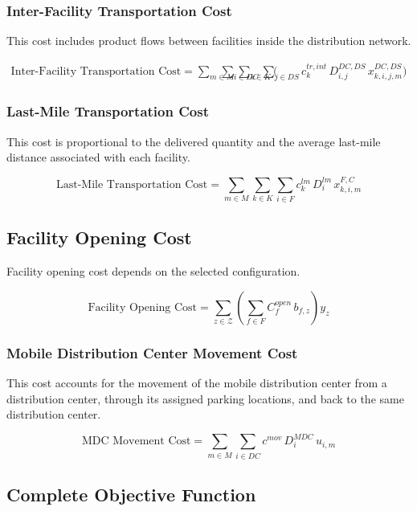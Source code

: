 \documentclass[12pt]{article}
\begin{document}
\subsubsection{Inter-Facility Transportation Cost}

This cost includes product flows between facilities inside the distribution network.

\begin{align*}
\text{Inter-Facility Transportation Cost}
=
\sum_{m \in M} \sum_{k \in K}
\Bigg(
& \sum_{i \in DC} \sum_{j \in DS}
c^{tr,int}_k \, D^{DC,DS}_{i,j} \, x^{DC,DS}_{k,i,j,m}
\Bigg)
\end{align*}

\subsubsection{Last-Mile Transportation Cost}

This cost is proportional to the delivered quantity and the average last-mile distance associated with each facility.

\[
\text{Last-Mile Transportation Cost}
=
\sum_{m \in M}\sum_{k \in K}\sum_{i \in F}
c^{lm}_k \, D^{lm}_i \, x^{F,C}_{k,i,m}
\]

\subsection{Facility Opening Cost}

Facility opening cost depends on the selected configuration.

\[
\text{Facility Opening Cost}
=
\sum_{z \in \mathcal{Z}}
\left(
\sum_{f \in F} C^{open}_f \, b_{f,z}
\right) y_z
\]

\subsubsection{Mobile Distribution Center Movement Cost}

This cost accounts for the movement of the mobile distribution center from a distribution center, through its assigned parking locations, and back to the same distribution center.

\[
\text{MDC Movement Cost}
=
\sum_{m \in M}\sum_{i \in DC}
c^{mov}\, D^{MDC}_{i}\, u_{i,m}
\]

\subsection{Complete Objective Function}
\end{document}

